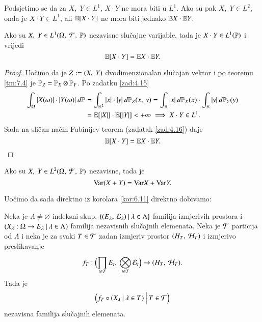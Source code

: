 Podsjetimo se da za $X, \; Y \in L^1$, $X \cdot Y$ ne mora biti u $L^1$. Ako su pak $X, \; Y \in L^2$, onda je $X \cdot Y \in L^1$, ali $\mathbb{E} [X \cdot Y]$ ne mora biti jednako $\mathbb{E} X \cdot \mathbb{E} Y$.

\begin{tm}  \label{tm:7.7}
    Ako su $X, \; Y \in L^1 (\Omega, \: \mathcal{F}, \: \mathbb{P})$ nezavisne slu\v cajne varijable, tada je $X \cdot Y \in L^1(\mathbb{P})$ i vrijedi
    \begin{equation*}
        \mathbb{E} [X \cdot Y] = \mathbb{E} X \cdot \mathbb{E} Y.
    \end{equation*}
\end{tm}

\begin{proof}
    Uo\v cimo da je $Z:=({X}, \: {Y})$ dvodimenzionalan slu\v cajan vektor i po teoremu \ref{tm:7.4} je $\mathbb{P}_Z = \mathbb{P}_X \otimes \mathbb{P}_Y$.
    Po zadatku \ref{zad:4.15}
    \begin{align*}
        \int_\Omega |X(\omega)| \cdot |Y(\omega)| \: d \mathbb{P}
        &= \int_{\mathbb{R}^2} |x| \cdot |y| \: d \mathbb{P}_Z ({x}, \: {y}) = \int_{\mathbb{R}} |x| \: d \mathbb{P}_X (x) \cdot \int_{\mathbb{R}} |y| \: d \mathbb{P}_Y (y)\\
        &= \mathbb{E} [|X|] \cdot \mathbb{E} [|Y|] < +\infty \implies X \cdot Y \in L^1.
    \end{align*}
    Sada na sli\v can na\v cin Fubinijev teorem (zadatak \ref{zad:4.16}) daje
    \begin{equation*}
        \mathbb{E} [X \cdot Y] = \mathbb{E} X \cdot \mathbb{E} Y.
    \end{equation*}
\end{proof}

\begin{zad} \label{zad:7.8}
    Ako su $X, \; Y \in L^2 (\Omega, \: \mathcal{F}, \: \mathbb{P})$ nezavisne, tada je
    \begin{equation*}
        \mathrm{Var} (X + Y) = \mathrm{Var} X + \mathrm{Var} Y.
    \end{equation*}
\end{zad}

Uo\v cimo da sada direktno iz korolara \ref{kor:6.11} direktno dobivamo:

\begin{kor} \label{kor:7.9}
    Neka je $\Lambda \neq  \varnothing$ indeksni skup, $\{{({E_\lambda}, \: {\mathcal{E}_\lambda})} \: | \: {\lambda \in \Lambda}\}$ familija izmjerivih prostora i $({X_\lambda : \Omega \to E_\lambda} \: | \: {\lambda \in \Lambda})$ familija nezavisnih slu\v cajnih elemenata.
    Neka je $\mathcal{T}$ particija od $\Lambda$ i neka je za svaki $T \in \mathcal{T}$ zadan izmjeriv prostor $({H_T}, \: {\mathcal{H}_T})$ i izmjerivo preslikavanje
    \begin{equation*}
        f_T : \Big( {\prod\limits_{t \in T}^{} E_t}, \: {\bigotimes\limits_{t \in T}^{} \mathcal{E}_t} \Big) \to ({H_T}, \: {\mathcal{H}_T}).
    \end{equation*}
    Tada je
    \begin{equation*}
        \Big( {f_T \circ ({X_\lambda} \: | \: {\lambda \in T})} \: \Big| \: {T \in \mathcal{T}} \Big)    
    \end{equation*}
    nezavisna familija slu\v cajnih elemenata.
\end{kor}

